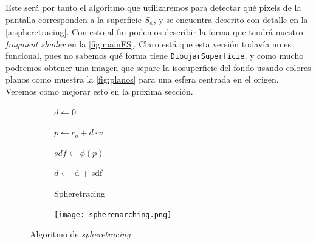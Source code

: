 Este será por tanto el algoritmo que utilizaremos para detectar qué pixels de la pantalla corresponden a la superficie $S_{\phi}$, y se encuentra descrito con detalle en la \autoref{a:spheretracing}. 
Con esto al fin podemos describir la forma que tendrá nuestro \textit{fragment shader} en la \autoref{fig:mainFS}. Claro está que esta versión todavía no es funcional, pues no sabemos qué forma tiene \texttt{DibujarSuperficie}, y como mucho podremos obtener una imagen que separe la isosuperficie del fondo usando colores planos como muestra la \autoref{fig:planos} para una esfera centrada en el origen. Veremos como mejorar esto en la próxima sección.

\begin{figure}[ht!]
    \centering
    \begin{subfigure}[b]{0.58\textwidth}
       \begin{algorithm}[H]
            \caption{Spheretracing}
                $d \gets 0$ 
                
                 {
                    $p \gets c_o + d \cdot v$
                    
                    $sdf \gets \phi(p)$
                    
            
                    $d \gets$ d + sdf
            
                }
        \end{algorithm}
    \end{subfigure}%
    \hfill
    \begin{subfigure}[b]{0.4\textwidth}
        \texttt{[image: spheremarching.png]}
    \end{subfigure}
    \caption{Algoritmo de \textit{spheretracing}}
    \label{a:spheretracing}
\end{figure}

